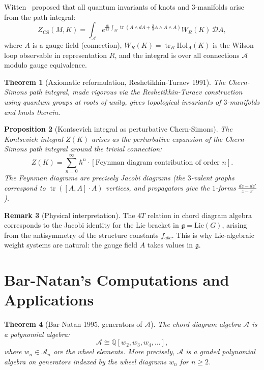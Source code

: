 \documentclass[12pt,a4paper]{amsart}
\newtheorem{theorem}{Theorem}[section]
\newtheorem{proposition}[theorem]{Proposition}
\theoremstyle{definition}
\newtheorem{remark}[theorem]{Remark}
\newcommand{\Q}{\mathbb{Q}}
\DeclareMathOperator{\tr}{tr}
\begin{document}
Witten~\cite{witten1989} proposed that all quantum invariants of knots and
$3$-manifolds arise from the path integral:
\[
  Z_{\mathrm{CS}}(M, K) = \int_{\mathcal{A}} e^{\frac{ik}{4\pi} \int_M \tr\!(A \wedge dA + \tfrac{2}{3} A \wedge A \wedge A)} W_R(K) \,\mathcal{D}A,
\]
where $A$ is a gauge field (connection), $W_R(K) = \tr_R \mathrm{Hol}_A(K)$
is the Wilson loop observable in representation $R$, and the integral is over
all connections $\mathcal{A}$ modulo gauge equivalence.

\begin{theorem}[Axiomatic reformulation, Reshetikhin-Turaev 1991]
The Chern-Simons path integral, made rigorous via the Reshetikhin-Turaev
construction~\cite{reshetikhin1991} using quantum groups at roots of unity,
gives topological invariants of $3$-manifolds and knots therein.
\end{theorem}

\begin{proposition}[Kontsevich integral as perturbative Chern-Simons]
The Kontsevich integral $Z(K)$ arises as the perturbative expansion of the
Chern-Simons path integral around the trivial connection:
\[
  Z(K) = \sum_{n=0}^\infty \hbar^n \cdot [\text{Feynman diagram contribution of order } n].
\]
The Feynman diagrams are precisely Jacobi diagrams (the $3$-valent graphs
correspond to $\tr([A,A] \cdot A)$ vertices, and propagators give the
$1$-forms $\frac{dz-dz'}{z-z'}$).
\end{proposition}

\begin{remark}[Physical interpretation]
The $4T$ relation in chord diagram algebra corresponds to the Jacobi identity
for the Lie bracket in $\mathfrak{g} = \mathrm{Lie}(G)$, arising from the
antisymmetry of the structure constants $f_{abc}$.  This is why Lie-algebraic
weight systems are natural: the gauge field $A$ takes values in $\mathfrak{g}$.
\end{remark}

\section{Bar-Natan's Computations and Applications}\label{sec:barnatan}

\begin{theorem}[Bar-Natan 1995, generators of $\mathcal{A}$]
\label{thm:generators}
The chord diagram algebra $\mathcal{A}$ is a polynomial algebra:
\[
  \mathcal{A} \cong \Q[w_2, w_3, w_4, \ldots],
\]
where $w_n \in \mathcal{A}_n$ are the \emph{wheel elements}.  More precisely,
$\mathcal{A}$ is a graded polynomial algebra on generators indexed by the
wheel diagrams $w_n$ for $n \geq 2$.
\end{theorem}
\end{document}
